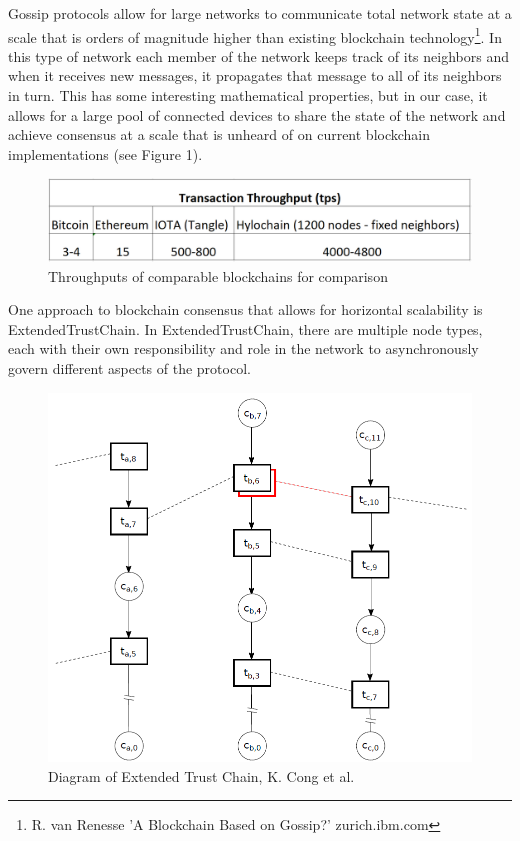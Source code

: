 \documentclass{article}
\begin{document}
Gossip protocols allow for large networks to communicate total network state at a scale that is orders of magnitude higher than existing blockchain technology\footnote{R. van Renesse 'A Blockchain Based on Gossip?' zurich.ibm.com}. In this type of network each member of the network keeps track of its neighbors and when it receives new messages, it propagates that message to all of its neighbors in turn. This has some interesting mathematical properties, but in our case, it allows for a large pool of connected devices to share the state of the network and achieve consensus at a scale that is unheard of on current blockchain implementations (see Figure 1).

\begin{figure}[H]
\centering
\includegraphics[scale=0.30]{Throughput.png}
\caption{Throughputs of comparable blockchains for comparison}
\end{figure} 

One approach to blockchain consensus that allows for horizontal scalability is ExtendedTrustChain. In ExtendedTrustChain, there are multiple node types, each with their own responsibility and role in the network to asynchronously govern different aspects of the protocol. 

\begin{figure}[H]
\centering
\includegraphics[scale=0.62]{kcong-extended-trust-chain.PNG}
\caption{Diagram of Extended Trust Chain, K. Cong et al.}
\end{figure} 
\end{document}
